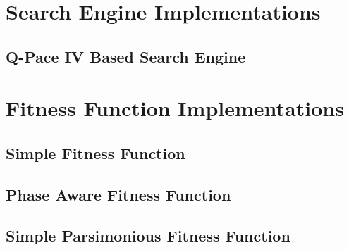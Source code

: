 \section{Search Engine Implementations}
\subsection{Q-Pace IV Based Search Engine}

\section{Fitness Function Implementations}
\subsection{Simple Fitness Function}

\subsection{Phase Aware Fitness Function}

\subsection{Simple Parsimonious Fitness Function}

